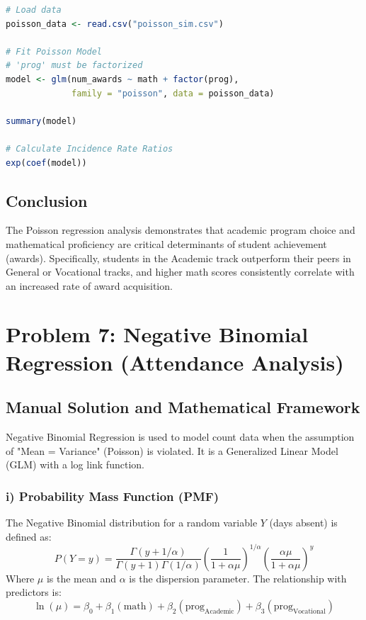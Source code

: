 \documentclass[12pt]{article}
\begin{document}
\begin{lstlisting}[language=R, caption=R implementation for Poisson Regression]
# Load data
poisson_data <- read.csv("poisson_sim.csv")

# Fit Poisson Model
# 'prog' must be factorized
model <- glm(num_awards ~ math + factor(prog), 
             family = "poisson", data = poisson_data)

summary(model)

# Calculate Incidence Rate Ratios
exp(coef(model))
\end{lstlisting}

\subsection{Conclusion}
The Poisson regression analysis demonstrates that academic program choice and mathematical proficiency are critical determinants of student achievement (awards). Specifically, students in the Academic track outperform their peers in General or Vocational tracks, and higher math scores consistently correlate with an increased rate of award acquisition.

\newpage
\section{Problem 7: Negative Binomial Regression (Attendance Analysis)}
\label{prob_nb_attendance}

\subsection{Manual Solution and Mathematical Framework}
Negative Binomial Regression is used to model count data when the assumption of "Mean = Variance" (Poisson) is violated. It is a Generalized Linear Model (GLM) with a log link function.

\subsubsection{i) Probability Mass Function (PMF)}
The Negative Binomial distribution for a random variable $Y$ (days absent) is defined as:
\[ P(Y=y) = \frac{\Gamma(y + 1/\alpha)}{\Gamma(y+1)\Gamma(1/\alpha)} \left(\frac{1}{1+\alpha\mu}\right)^{1/\alpha} \left(\frac{\alpha\mu}{1+\alpha\mu}\right)^y \]
Where $\mu$ is the mean and $\alpha$ is the dispersion parameter. The relationship with predictors is:
\[ \ln(\mu) = \beta_0 + \beta_1(\text{math}) + \beta_2(\text{prog}_{\text{Academic}}) + \beta_3(\text{prog}_{\text{Vocational}}) \]
\end{document}
